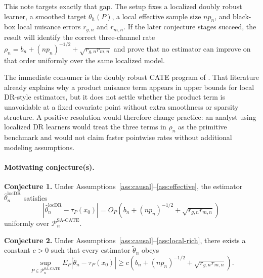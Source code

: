 \documentclass[11pt]{article}
\theoremstyle{definition}
\theoremstyle{plain}
\theoremstyle{remark}
\begin{document}
This note targets exactly that gap. The setup fixes a localized doubly robust learner, a smoothed
target $\theta_h(P)$, a local effective sample size $n p_n$, and black-box local nuisance errors
$r_{g,n}$ and $r_{m,n}$. If the later conjecture stages succeed, the result will identify the correct
three-channel rate
$
\rho_n=b_n+(n p_n)^{-1/2}+\sqrt{r_{g,n}r_{m,n}}
$
and prove that no estimator can improve on that order uniformly over the same localized model.

The immediate consumer is the doubly robust CATE program of \citet{Kennedy2023DRCATE}. That
literature already explains why a product nuisance term appears in upper bounds for local DR-style
estimators, but it does not settle whether the product term is unavoidable at a fixed covariate point
without extra smoothness or sparsity structure. A positive resolution would therefore change practice:
an analyst using localized DR learners would treat the three terms in $\rho_n$ as the primitive
benchmark and would not claim faster pointwise rates without additional modeling assumptions.

\paragraph{Motivating conjecture(s).}
\textbf{Conjecture 1.} Under Assumptions~\ref{ass:causal}--\ref{ass:effective}, the estimator $\hat\theta_n^{\mathrm{locDR}}$ satisfies
\[
  \left|\hat\theta_n^{\mathrm{locDR}}-\tau_P(x_0)\right|
  =O_P\!\left(b_n+(n p_n)^{-1/2}+\sqrt{r_{g,n}r_{m,n}}\right)
\]
uniformly over $\mathcal{P}_n^{\mathrm{SA\text{-}CATE}}$.

\textbf{Conjecture 2.} Under Assumptions~\ref{ass:causal}--\ref{ass:local-rich}, there exists a constant $c>0$ such that every estimator $\tilde\theta_n$ obeys
\[
  \sup_{P\in\mathcal{P}_n^{\mathrm{SA\text{-}CATE}}}
  E_P\left|\tilde\theta_n-\tau_P(x_0)\right|
  \ge c\left(b_n+(n p_n)^{-1/2}+\sqrt{r_{g,n}r_{m,n}}\right).
\]
\end{document}
